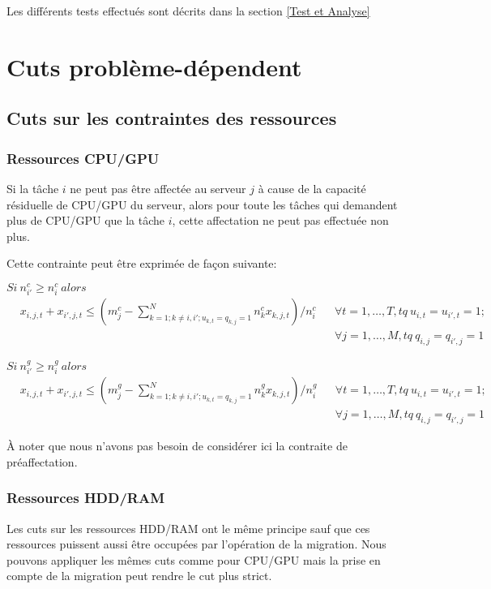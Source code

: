 \documentclass[twoside,fleqn]{EPURapport}
\begin{document}
Les différents tests effectués sont décrits dans la section \ref{Test et Analyse}

\section{Cuts problème-dépendent}
\subsection{Cuts sur les contraintes des ressources}
\subsubsection{Ressources CPU/GPU}
Si la tâche $i$ ne peut pas être affectée au serveur $j$ à cause de la capacité résiduelle de CPU/GPU du serveur, alors pour toute les tâches qui demandent plus de CPU/GPU que la tâche $i$, cette affectation ne peut pas effectuée non plus.


Cette contrainte peut être exprimée de façon suivante:
\bigskip

$Si \  n^c_{i\prime}\geq n^c_{i}\ alors\;$
\begin{align} 
&x_{i,j,t}+x_{i\prime,j,t}\leq (m^c_j-\sum^N_{k=1; k\neq{i},i\prime;u_{k,t}=q_{k,j}=1}{n^c_kx_{k,j,t}})/n^c_i
&&\forall t=1,\ldots,T, tq\ u_{i,t}=u_{i\prime,t}=1; \nonumber \\
 & &&\forall j=1, \ldots, M, tq\ q_{i,j}=q_{i\prime,j}=1
\end{align} 
 
$Si\ n^g_{i\prime}\geq n^g_{i}\ alors\;$
\begin{align} 
&x_{i,j,t}+x_{i\prime,j,t}\leq (m^g_j-\sum^N_{k=1; k\neq{i},i\prime;u_{k,t}=q_{k,j}=1}{n^g_kx_{k,j,t}})/n^g_i 
&&\forall t=1,\ldots,T, tq\ u_{i,t}=u_{i\prime,t}=1; \nonumber \\
 & &&\forall j=1, \ldots, M, tq\ q_{i,j}=q_{i\prime,j}=1
\end{align} 


À noter que nous n'avons pas besoin de considérer ici la contraite de préaffectation.

\subsubsection{Ressources HDD/RAM}
Les cuts sur les ressources HDD/RAM ont le même principe sauf que ces ressources puissent aussi être occupées par l'opération de la migration. Nous pouvons appliquer les mêmes cuts comme pour CPU/GPU mais la prise en compte de la migration peut rendre le cut plus strict.
\bigskip
\end{document}

